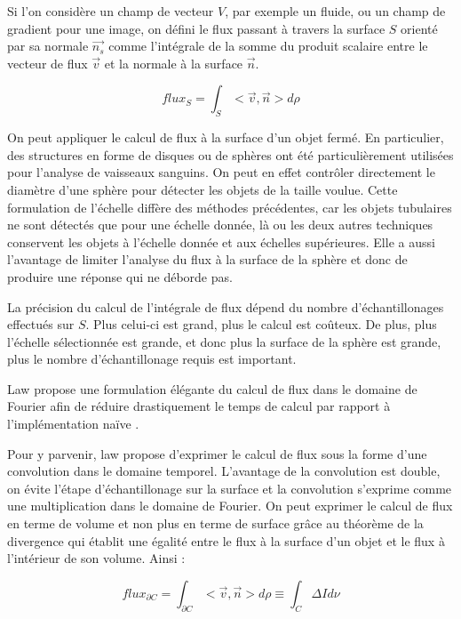 Si l'on considère un champ de vecteur $V$, par exemple un fluide, ou un champ de gradient pour une image, on défini le flux passant à travers la surface $S$ orienté par sa normale $\vec{n_s}$ comme l'intégrale de la somme du produit scalaire entre le vecteur de flux $\vec{v}$ et la normale à la surface $\vec{n}$.

\begin{equation}
flux_S = \int_{S}< \vec{v},\vec{n} > d\rho
\end{equation}

On peut appliquer le calcul de flux à la surface d'un objet fermé. En particulier, des structures en forme de disques ou de sphères ont été particulièrement utilisées pour l'analyse de vaisseaux sanguins. On peut en effet contrôler directement le diamètre d'une sphère pour détecter les objets de la taille voulue. Cette formulation de l'échelle diffère des méthodes précédentes, car les objets tubulaires ne sont détectés que pour une échelle donnée, là ou les deux autres techniques conservent les objets à l'échelle donnée et aux échelles supérieures. Elle a aussi l'avantage de limiter l'analyse du flux à la surface de la sphère et donc de produire une réponse qui ne déborde pas.

La précision du calcul de l'intégrale de flux dépend du nombre d'échantillonages effectués sur $S$. Plus celui-ci est grand, plus le calcul est coûteux. De plus, plus l'échelle sélectionnée est grande, et donc plus la surface de la sphère est grande, plus le nombre d'échantillonage requis est important.

Law propose une formulation élégante du calcul de flux dans le domaine de Fourier afin de réduire drastiquement le temps de calcul par rapport à l'implémentation naïve \cite{law2009_efficient_implementation}.

Pour y parvenir, law propose d'exprimer le calcul de flux sous la forme d'une convolution dans le domaine temporel. L'avantage de la convolution est double, on évite l'étape d'échantillonage sur la surface et la convolution s'exprime comme une multiplication dans le domaine de Fourier. On peut exprimer le calcul de flux en terme de volume et non plus en terme de surface grâce au théorème de la divergence qui établit une égalité entre le flux à la surface d'un objet et le flux à l'intérieur de son volume. Ainsi :

\begin{equation}
  flux_{\partial C} = \int_{\partial C}< \vec{v},\vec{n} > d\rho \equiv \int_{C }\Delta I d\nu
\end{equation}

